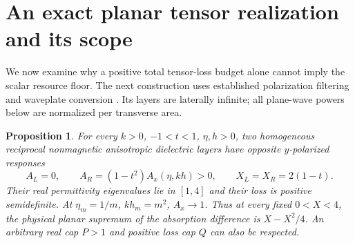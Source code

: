 \documentclass[11pt,a4paper]{article}
\newtheorem{proposition}[theorem]{Proposition}
\theoremstyle{remark}
\begin{document}
\section{An exact planar tensor realization and its scope}\label{sec:vector}
We now examine why a positive total tensor-loss budget alone cannot imply the scalar resource floor. The next construction uses established polarization filtering and waveplate conversion \citep{Armitage2014,Potton2004,Khurgin2021}. Its layers are laterally infinite; all plane-wave powers below are normalized per transverse area.

\begin{proposition}\label{prop:vector}
For every $k>0$, $-1<t<1$, $\eta,h>0$, two homogeneous reciprocal nonmagnetic anisotropic dielectric layers have opposite $y$-polarized responses
\begin{equation}\label{eq:vector-powers}
 A_L=0,\qquad A_R=(1-t^2)A_x(\eta,kh)>0,\qquad X_L=X_R=2(1-t).
\end{equation}
Their real permittivity eigenvalues lie in $[1,4]$ and their loss is positive semidefinite. At $\eta_m=1/m$, $kh_m=m^2$, $A_x\to1$. Thus at every fixed $0<X<4$, the physical planar supremum of the absorption difference is $X-X^2/4$. An arbitrary real cap $P>1$ and positive loss cap $Q$ can also be respected.
\end{proposition}
\end{document}
